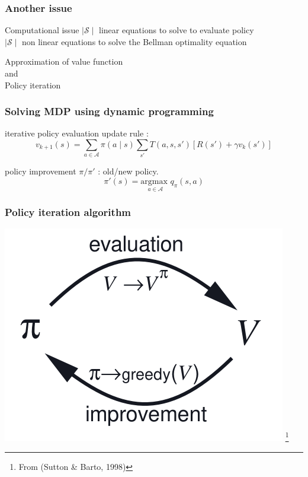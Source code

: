 \documentclass[dvipsnames,svgnames]{beamer}
\begin{document}
\begin{frame}
\frametitle{Another issue}
\begin{alertblock}{Computational issue}
$\mid \mathcal{S} \mid $ linear equations to solve to evaluate policy\\
$\mid \mathcal{S} \mid $ non linear equations to solve the Bellman optimality equation 
\end{alertblock}

\pause 
\vspace{1cm}
\centering
Approximation of value function
\\ and
\\Policy iteration

\end{frame}

\begin{frame}
\frametitle{Solving MDP using dynamic programming}
\begin{block}{iterative policy evaluation}
update rule : 
$$ v_{k+1}(s)=\sum_{a \in \mathcal{A}}\pi(a \mid s)\sum_{s'}T(a,s,s')\left[R(s')+\gamma v_k(s')\right] $$
\end{block}
\pause
\begin{block}{policy improvement}
$\pi/\pi'$ : old/new policy.
$$\pi'(s) = \underset{a \in \mathcal{A}}{\text{argmax } } q_{\pi}(s,a) $$
\end{block}

\end{frame}


\begin{frame}
\frametitle{Policy iteration algorithm}
\centering
\includegraphics[scale=0.7]{img/policy_iter_sutton.PNG}
\footnote{From (Sutton \& Barto, 1998)}

\end{frame}
\end{document}
